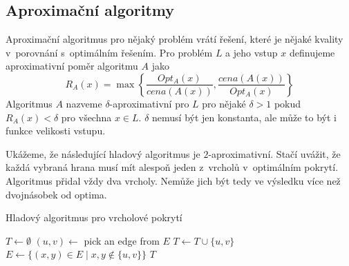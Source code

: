 \subsection{Aproximační algoritmy}

Aproximační algoritmus pro nějaký problém vrátí řešení, které je nějaké
kvality v~porovnání s~optimálním řešením.
Pro problém $L$ a jeho vstup $x$ definujeme aproximativní poměr
algoritmu $A$ jako
\[
    R_A(x) = \max \left\{ \frac{Opt_A(x)}{cena(A(x))},
    \frac{cena(A(x))}{Opt_A(x)} \right\}
\]
Algoritmus $A$ nazveme $\delta$-aproximativní pro $L$ pro
nějaké $\delta > 1$ pokud $R_A(x) < \delta$ pro všechna $x \in L$.
$\delta$ nemusí být jen konstanta, ale může to být i funkce velikosti
vstupu.

\begin{example}
Ukážeme, že následující hladový algoritmus je $2$-aproximativní.  Stačí
uvážit, že každá vybraná hrana musí mít alespoň jeden z~vrcholů
v~optimálním pokrytí. Algoritmus přidal vždy dva vrcholy. Nemůže jich
být tedy ve výsledku více než dvojnásobek od optima.

\begin{algorithm}
\caption{Hladový algoritmus pro vrcholové pokrytí}
\begin{algorithmic}[1]
    \State $T \gets \emptyset$
        \State $(u,v) \gets$ pick an edge from $E$
        \State $T \gets T \cup \{u,v\}$
        \State $E \gets \{ (x,y) \in E \mid x,y \not \in \{u, v\} \}$
    \EndWhile
    \State \Return $T$
\EndFunction
\end{algorithmic}
\end{algorithm}
\end{example}

